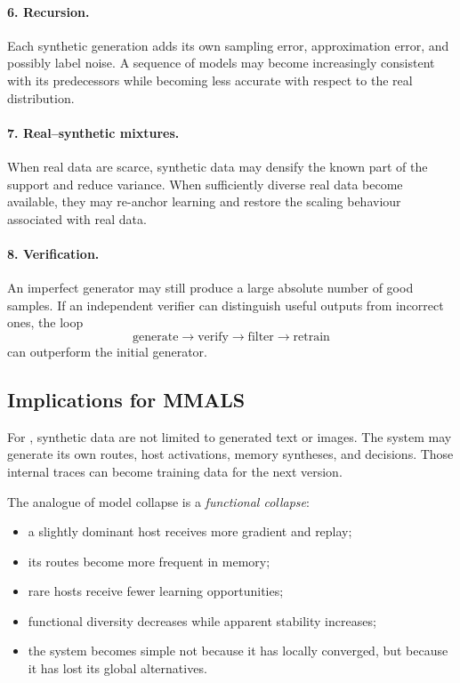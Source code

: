 \paragraph{6. Recursion.} Each synthetic generation adds its own sampling error, approximation error, and possibly label noise. A sequence of models may become increasingly consistent with its predecessors while becoming less accurate with respect to the real distribution.

\paragraph{7. Real--synthetic mixtures.} When real data are scarce, synthetic data may densify the known part of the support and reduce variance. When sufficiently diverse real data become available, they may re-anchor learning and restore the scaling behaviour associated with real data.

\paragraph{8. Verification.} An imperfect generator may still produce a large absolute number of good samples. If an independent verifier can distinguish useful outputs from incorrect ones, the loop
\[
\text{generate} \rightarrow \text{verify} \rightarrow \text{filter} \rightarrow \text{retrain}
\]
can outperform the initial generator.

\subsection{Implications for MMALS}

For \MMALS, synthetic data are not limited to generated text or images. The system may generate its own routes, host activations, memory syntheses, and decisions. Those internal traces can become training data for the next version.

The analogue of model collapse is a \emph{functional collapse}:

\begin{itemize}[leftmargin=*]
  \item a slightly dominant host receives more gradient and replay;
  \item its routes become more frequent in memory;
  \item rare hosts receive fewer learning opportunities;
  \item functional diversity decreases while apparent stability increases;
  \item the system becomes simple not because it has locally converged, but because it has lost its global alternatives.
\end{itemize}

